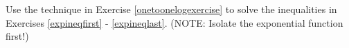 {Use the technique in Exercise \ref{onetoonelogexercise} to solve the inequalities in Exercises \ref{expineqfirst} - \ref{expineqlast}. (NOTE:  Isolate the exponential function first!)}
{}